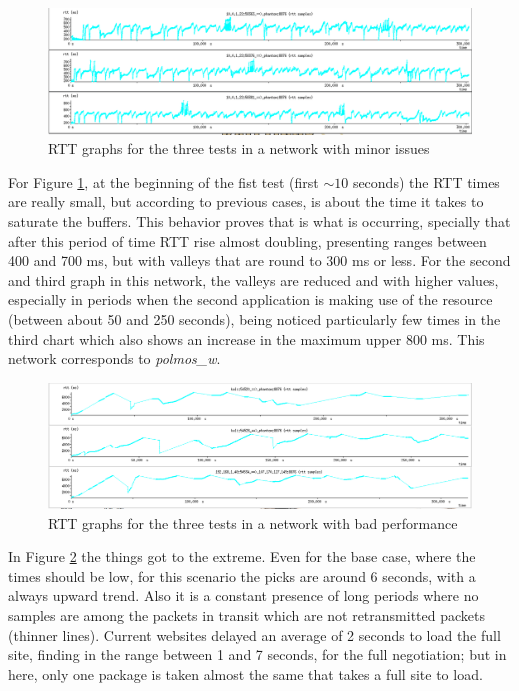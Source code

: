 \begin{figure}[ht]
\centering
    \includegraphics[width=\textwidth]{img/n_iperf_mid}
\caption[Iperf: RTT graphs for a network with minor issues]{RTT graphs for the three tests in a network with minor issues}
\label{fig:iperfmid}
\end{figure}%


For Figure \ref{fig:iperfmid}, at the beginning of the fist test (first $\sim10$ seconds) the RTT times are really small, but according to previous cases, is about the time it takes to saturate the buffers. This behavior proves that is what is occurring, specially that after this period of time RTT rise almost doubling, presenting ranges between 400 and 700 ms, but with valleys that are round to  300 ms or less. For the second and third graph in this network, the valleys are reduced and with higher values, especially in periods when the second application is making use of the resource (between about 50 and 250 seconds), being noticed particularly few times in the third chart which also shows an increase in the maximum upper 800 ms. This network corresponds to \emph{polmos\_w}.

\begin{figure}[ht]
\centering
    \includegraphics[width=\textwidth]{img/n_iperf_bad}
\caption[Iperf: RTT graphs for a network with bad performance]{RTT graphs for the three tests in a network with bad performance}
\label{fig:iperfbad}
\end{figure}%

In Figure \ref{fig:iperfbad} the things got to the extreme. Even for the base
case, where the times should be low, for this scenario the picks are around 6
seconds, with a always upward trend. Also it is a constant presence of long
periods where no samples are among the packets in transit which are not
retransmitted packets (thinner lines). Current websites delayed an average of 2
seconds to load the full site, finding in the range between 1 and 7 seconds,
for the full negotiation; but in here, only one package is taken almost the
same that takes a full site to load.

